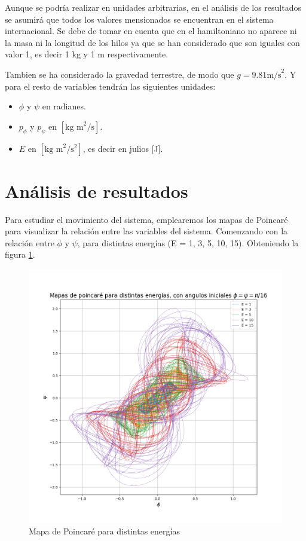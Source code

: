 \documentclass[11pt, twoside]{article} %
\begin{document}
Aunque se podría realizar en unidades arbitrarias, en el análisis 
de los resultados se asumirá que todos los valores mensionados se 
encuentran en el sistema internacional. Se debe de tomar en cuenta que 
en el hamiltoniano no aparece ni la masa ni la longitud de los hilos 
ya que se han considerado que son iguales con valor 1, es decir 1 kg y 
1 m respectivamente. 

Tambien se ha considerado la gravedad terrestre, de modo que 
$g = 9.81 \text{m/s}^2$. Y para el resto de variables tendrán las 
siguientes unidades:

\begin{itemize}
    \item $\phi$ y $\psi$ en radianes.
    \item $p_\phi$ y $p_\psi$ en $[\text{kg m}^2/\text{s}]$.
    \item $E$ en $[\text{kg m}^2/\text{s}^2]$, es decir en julios [J].
\end{itemize}

\section{Análisis de resultados}

Para estudiar el movimiento del sistema, emplearemos los mapas de 
Poincaré para visualizar la relación entre las variables del sistema. 
Comenzando con la relación entre $\phi$ y $\psi$, para distintas 
energías (E = 1, 3, 5, 10, 15). Obteniendo la figura 
\ref{fig:poincare_energias}.

\begin{figure}[h!]
    \centering
    \includegraphics[width=\textwidth]{plots/poincare_energias.png}
    \caption{Mapa de Poincaré para distintas energías}
    \label{fig:poincare_energias}
\end{figure}
\end{document}
